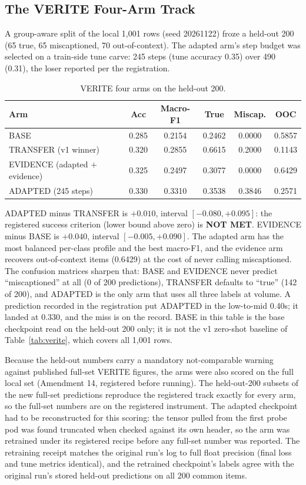 \documentclass{article} %
\begin{document}
\subsection{The VERITE Four-Arm Track}
A group-aware split of the local 1,001 rows (seed 20261122) froze a held-out 200 (65 true, 65 miscaptioned, 70 out-of-context). The adapted arm's step budget was selected on a train-side tune carve: 245 steps (tune accuracy 0.35) over 490 (0.31), the loser reported per the registration.

\begin{table}[t]
\centering
\small
\caption{VERITE four arms on the held-out 200.}
\label{tab:verite4}
\begin{tabular}{lccccc}
\toprule
Arm & Acc & Macro-F1 & True & Miscap. & OOC \\
\midrule
BASE & 0.285 & 0.2154 & 0.2462 & 0.0000 & 0.5857 \\
TRANSFER (v1 winner) & 0.320 & 0.2855 & 0.6615 & 0.2000 & 0.1143 \\
EVIDENCE (adapted \(+\) evidence) & 0.325 & 0.2497 & 0.3077 & 0.0000 & 0.6429 \\
ADAPTED (245 steps) & 0.330 & 0.3310 & 0.3538 & 0.3846 & 0.2571 \\
\bottomrule
\end{tabular}
\end{table}

ADAPTED minus TRANSFER is \(+0.010\), interval \([-0.080, +0.095]\): the registered success criterion (lower bound above zero) is \textbf{NOT MET}. EVIDENCE minus BASE is \(+0.040\), interval \([-0.005, +0.090]\). The adapted arm has the most balanced per-class profile and the best macro-F1, and the evidence arm recovers out-of-context items (0.6429) at the cost of never calling miscaptioned. The confusion matrices sharpen that: BASE and EVIDENCE never predict ``miscaptioned'' at all (0 of 200 predictions), TRANSFER defaults to ``true'' (142 of 200), and ADAPTED is the only arm that uses all three labels at volume. A prediction recorded in the registration put ADAPTED in the low-to-mid 0.40s; it landed at 0.330, and the miss is on the record. BASE in this table is the base checkpoint read on the held-out 200 only; it is not the v1 zero-shot baseline of Table~\ref{tab:verite}, which covers all 1,001 rows.

Because the held-out numbers carry a mandatory not-comparable warning against published full-set VERITE figures, the arms were also scored on the full local set (Amendment 14, registered before running). The held-out-200 subsets of the new full-set predictions reproduce the registered track exactly for every arm, so the full-set numbers are on the registered instrument. The adapted checkpoint had to be reconstructed for this scoring: the tensor pulled from the first probe pod was found truncated when checked against its own header, so the arm was retrained under its registered recipe before any full-set number was reported. The retraining receipt matches the original run's log to full float precision (final loss and tune metrics identical), and the retrained checkpoint's labels agree with the original run's stored held-out predictions on all 200 common items.
\end{document}
